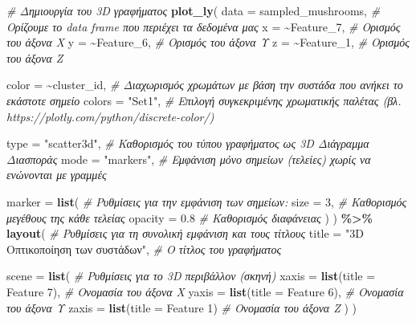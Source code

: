\documentclass[
]{article}
\newenvironment{Shaded}{\begin{snugshade}}{\end{snugshade}}
\newcommand{\AttributeTok}[1]{\textcolor[rgb]{0.13,0.29,0.53}{#1}}
\newcommand{\CommentTok}[1]{\textcolor[rgb]{0.56,0.35,0.01}{\textit{#1}}}
\newcommand{\DecValTok}[1]{\textcolor[rgb]{0.00,0.00,0.81}{#1}}
\newcommand{\FloatTok}[1]{\textcolor[rgb]{0.00,0.00,0.81}{#1}}
\newcommand{\FunctionTok}[1]{\textcolor[rgb]{0.13,0.29,0.53}{\textbf{#1}}}
\newcommand{\NormalTok}[1]{#1}
\newcommand{\SpecialCharTok}[1]{\textcolor[rgb]{0.81,0.36,0.00}{\textbf{#1}}}
\newcommand{\StringTok}[1]{\textcolor[rgb]{0.31,0.60,0.02}{#1}}
\begin{document}
\begin{Shaded}
\begin{Highlighting}[]
\CommentTok{\# Δημιουργία του 3D γραφήματος}
\FunctionTok{plot\_ly}\NormalTok{(}
  \AttributeTok{data =}\NormalTok{ sampled\_mushrooms,       }\CommentTok{\# Ορίζουμε το data frame που περιέχει τα δεδομένα μας}
  \AttributeTok{x =} \SpecialCharTok{\textasciitilde{}}\NormalTok{Feature\_7,                }\CommentTok{\# Ορισμός του άξονα Χ}
  \AttributeTok{y =} \SpecialCharTok{\textasciitilde{}}\NormalTok{Feature\_6,                }\CommentTok{\# Ορισμός του άξονα Υ}
  \AttributeTok{z =} \SpecialCharTok{\textasciitilde{}}\NormalTok{Feature\_1,                }\CommentTok{\# Ορισμός του άξονα Z}
  
  \AttributeTok{color =} \SpecialCharTok{\textasciitilde{}}\NormalTok{cluster\_id,           }\CommentTok{\# Διαχωρισμός χρωμάτων με βάση την συστάδα που ανήκει το εκάστοτε σημείο}
  \AttributeTok{colors =} \StringTok{"Set1"}\NormalTok{,             }\CommentTok{\# Επιλογή συγκεκριμένης χρωματικής παλέτας (βλ. https://plotly.com/python/discrete{-}color/)}
  
  \AttributeTok{type =} \StringTok{"scatter3d"}\NormalTok{,            }\CommentTok{\# Καθορισμός του τύπου γραφήματος ως 3D Διάγραμμα Διασποράς}
  \AttributeTok{mode =} \StringTok{"markers"}\NormalTok{,               }\CommentTok{\# Εμφάνιση μόνο σημείων (τελείες) χωρίς να ενώνονται με γραμμές}
  
  \AttributeTok{marker =} \FunctionTok{list}\NormalTok{(                 }\CommentTok{\# Ρυθμίσεις για την εμφάνιση των σημείων:}
    \AttributeTok{size =} \DecValTok{3}\NormalTok{,                    }\CommentTok{\# Καθορισμός μεγέθους της κάθε τελείας}
    \AttributeTok{opacity =} \FloatTok{0.8}                \CommentTok{\# Καθορισμός διαφάνειας }
\NormalTok{  )}
\NormalTok{) }\SpecialCharTok{\%\textgreater{}\%} 
  \FunctionTok{layout}\NormalTok{(                        }\CommentTok{\# Ρυθμίσεις για τη συνολική εμφάνιση και τους τίτλους}
    \AttributeTok{title =} \StringTok{"3D Οπτικοποίηση των συστάδων"}\NormalTok{, }\CommentTok{\# Ο τίτλος του γραφήματος}
    
    \AttributeTok{scene =} \FunctionTok{list}\NormalTok{(                }\CommentTok{\# Ρυθμίσεις για το 3D περιβάλλον (σκηνή)}
      \AttributeTok{xaxis =} \FunctionTok{list}\NormalTok{(}\AttributeTok{title =} \StringTok{\textquotesingle{}Feature 7\textquotesingle{}}\NormalTok{), }\CommentTok{\# Ονομασία του άξονα Χ}
      \AttributeTok{yaxis =} \FunctionTok{list}\NormalTok{(}\AttributeTok{title =} \StringTok{\textquotesingle{}Feature 6\textquotesingle{}}\NormalTok{), }\CommentTok{\# Ονομασία του άξονα Υ}
      \AttributeTok{zaxis =} \FunctionTok{list}\NormalTok{(}\AttributeTok{title =} \StringTok{\textquotesingle{}Feature 1\textquotesingle{}}\NormalTok{)  }\CommentTok{\# Ονομασία του άξονα Ζ}
\NormalTok{    )}
\NormalTok{  )}
\end{Highlighting}
\end{Shaded}
\end{document}
